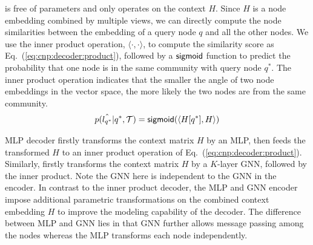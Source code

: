  is free of parameters and only operates on the context $H$. Since $H$ is a node embedding combined by multiple views, we can directly compute the node similarities between the embedding of a query node $q$ and all the other nodes. We use the inner product operation, $\langle \cdot, \cdot \rangle$, to compute the similarity score as Eq.~(\ref{eq:cnp:decoder:product}), followed by a $\mathsf{sigmoid}$ function to predict the probability that one node is in the same community with query node $q^*$.
The inner product operation indicates that the smaller the angle of two node embeddings in the vector space, the more likely the two nodes are from the same community.  
\begin{align}
	\label{eq:cnp:decoder:product}
	p(\hat{l_{q^*}} | q^*, \mathcal{T}) = \mathsf{sigmoid}(\langle H[q^*], H \rangle) 
\end{align}


 MLP decoder firstly transforms the context matrix $H$ by an MLP, then feeds the transformed $H$ to an inner product operation of Eq.~(\ref{eq:cnp:decoder:product}). Similarly, 
firstly transforms the context matrix $H$ by a $K$-layer GNN, followed by the inner product. Note the GNN here is independent to the GNN in the encoder.
In contrast to the inner product decoder, the MLP and GNN encoder impose additional parametric transformations on the combined context embedding $H$ to improve the modeling capability of the decoder. The difference between MLP and GNN lies in that GNN further allows message passing among the nodes whereas the MLP transforms each node independently. 

